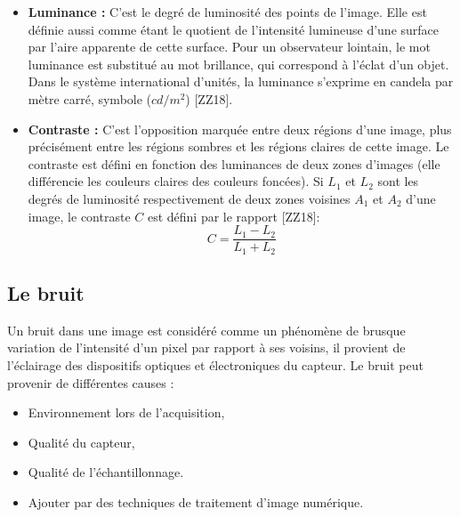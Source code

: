 \begin{itemize}
	\item \textbf{Luminance :}
	C’est le degré de luminosité des points de l’image. Elle est définie aussi comme étant le quotient de l’intensité lumineuse d’une surface par l’aire apparente de cette surface. Pour un observateur lointain, le mot luminance est substitué au mot brillance, qui correspond à l’éclat d’un objet.
	Dans le système international d'unités, la luminance s'exprime en candela par mètre carré, symbole ($cd/m^2$) [ZZ18].
	
	\item \textbf{Contraste :}
	C’est l’opposition marquée entre deux régions d’une image, plus
	précisément entre les régions sombres et les régions claires de cette image.
	Le contraste est défini en fonction des luminances de deux zones d’images (elle différencie les couleurs claires des couleurs foncées).
	Si $ L_1 $ et $ L_2 $ sont les degrés de luminosité respectivement de deux zones voisines $ A_1 $ et $ A_2 $ d’une image, le contraste $ C $ est défini par le rapport [ZZ18]:
	\begin{equation}
		 C = \frac{L_1 - L_2}{L_1 + L_2} 
	\end{equation}
\end{itemize}
 

 

\subsection{Le bruit}
Un bruit dans une image est considéré comme un phénomène de brusque
variation de l’intensité d’un pixel par rapport à ses voisins, il provient de l’éclairage des dispositifs optiques et électroniques du capteur.
Le bruit peut provenir de différentes causes :
\begin{itemize}
	\item Environnement lors de l'acquisition,
	\item Qualité du capteur,
	\item Qualité de l'échantillonnage.
	\item Ajouter par des techniques de traitement d'image numérique.
\end{itemize}


 
